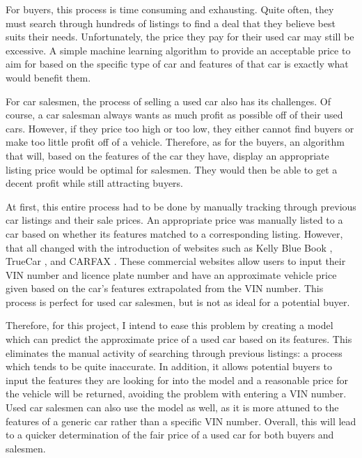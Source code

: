 \documentclass[compsoc]{IEEEtran}
\begin{document}
For buyers, this process is time consuming and exhausting. Quite often, they must search through hundreds of listings to find a deal that they believe best suits their needs. Unfortunately, the price they pay for their used car may still be excessive. A simple machine learning algorithm to provide an acceptable price to aim for based on the specific type of car and features of that car is exactly what would benefit them.

For car salesmen, the process of selling a used car also has its challenges. Of course, a car salesman always wants as much profit as possible off of their used cars. However, if they price too high or too low, they either cannot find buyers or make too little profit off of a vehicle. Therefore, as for the buyers, an algorithm that will, based on the features of the car they have, display an appropriate listing price would be optimal for salesmen. They would then be able to get a decent profit while still attracting buyers.

At first, this entire process had to be done by manually tracking through previous car listings and their sale prices. An appropriate price was manually listed to a car based on whether its features matched to a corresponding listing. However, that all changed with the introduction of websites such as Kelly Blue Book \cite{website:kbb}, TrueCar \cite{website:truecar}, and CARFAX \cite{website:carfax}. These commercial websites allow users to input their VIN number and licence plate number and have an approximate vehicle price given based on the car's features extrapolated from the VIN number. This process is perfect for used car salesmen, but is not as ideal for a potential buyer.

Therefore, for this project, I intend to ease this problem by creating a model which can predict the approximate price of a used car based on its features. This eliminates the manual activity of searching through previous listings: a process which tends to be quite inaccurate. In addition, it allows potential buyers to input the features they are looking for into the model and a reasonable price for the vehicle will be returned, avoiding the problem with entering a VIN number. Used car salesmen can also use the model as well, as it is more attuned to the features of a generic car rather than a specific VIN number. Overall, this will lead to a quicker determination of the fair price of a used car for both buyers and salesmen.


\end{document}
